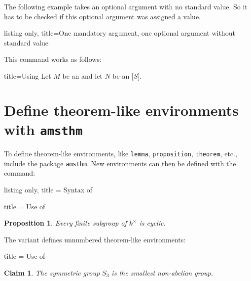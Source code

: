 \documentclass[a4paper, 10pt, headings=standardclasses, oneside, bibliography=totocnumbered]{scrbook}
\begin{document}
The following example takes an optional argument with no standard value.
So it has to be checked if this optional argument was assigned a value.
\begin{tcblisting}{listing only, title={One mandatory argument, one optional argument without standard value}}
\end{tcblisting}
This command works as follows:
\begin{tcblisting}{title={Using}}
Let $M$ be an  and let $N$ be an [$S$].
\end{tcblisting}





\section{Define theorem-like environments with \texttt{amsthm}}
\label{defining theorem like environments}

To define theorem-like environments, like \texttt{lemma}, \texttt{proposition}, \texttt{theorem}, etc., include the package \texttt{amsthm}.
New environments can then be defined with the  command:
\begin{tcblisting}{listing only, title = {Syntax of }}
\newtheorem{name of the environment}{title to be printed}
\end{tcblisting}
\begin{tcblisting}{title = {Use of }}
\newtheorem{proposition}{Proposition}
\begin{proposition}
  Every finite subgroup of $k^\times$ is cyclic.
\end{proposition}
\end{tcblisting}
The variant  defines unnumbered theorem-like environments:
\begin{tcblisting}{title = {Use of }}
\newtheorem*{claim}{Claim}
\begin{claim}
  The symmetric group $S_3$ is the smallest non-abelian group.
\end{claim}
\end{tcblisting}
\end{document}
